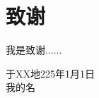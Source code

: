 \chapter{致\texorpdfstring{\NEFUspace}{}谢}
我是致谢......

\vspace{2cm}
\hfill
\begin{minipage}{14em}
\begin{center}
于XX地\quad 225年1月1日\\
我的名
\end{center}
\end{minipage}
